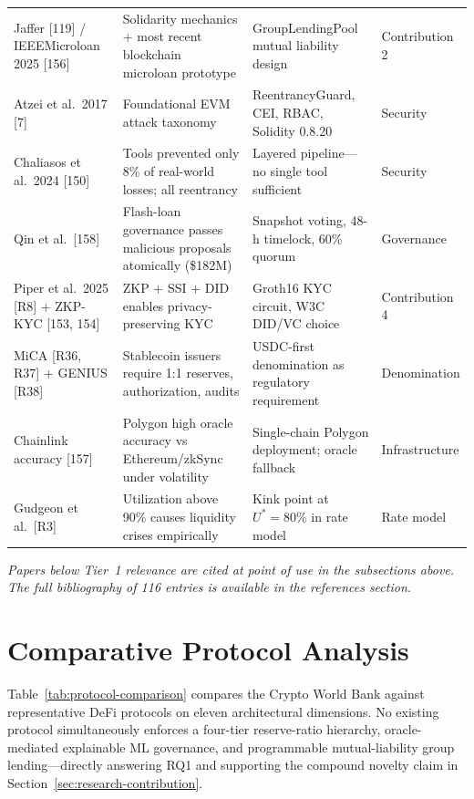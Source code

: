 \documentclass[12pt,a4paper]{report}
\begin{document}
\begin{table}[H]
{\begin{tabular}{@{}>{\raggedright\arraybackslash}p{2.8cm}>{\raggedright\arraybackslash}p{3.6cm}>{\raggedright\arraybackslash}p{3.8cm}>{\raggedright\arraybackslash}p{2.2cm}@{}}
Jaffer [119] / IEEEMicroloan 2025 [156] & Solidarity mechanics + most recent blockchain microloan prototype & GroupLendingPool mutual liability design & Contribution 2 \\
Atzei et al.\ 2017 [7] & Foundational EVM attack taxonomy & ReentrancyGuard, CEI, RBAC, Solidity 0.8.20 & Security \\
\rowcolor{RowShade}
Chaliasos et al.\ 2024 [150] & Tools prevented only 8\% of real-world losses; all reentrancy & Layered pipeline---no single tool sufficient & Security \\
Qin et al.\ [158] & Flash-loan governance passes malicious proposals atomically (\$182M) & Snapshot voting, 48-h timelock, 60\% quorum & Governance \\
\rowcolor{RowShade}
Piper et al.\ 2025 [R8] + ZKP-KYC [153, 154] & ZKP + SSI + DID enables privacy-preserving KYC & Groth16 KYC circuit, W3C DID/VC choice & Contribution 4 \\
MiCA [R36, R37] + GENIUS [R38] & Stablecoin issuers require 1:1 reserves, authorization, audits & USDC-first denomination as regulatory requirement & Denomination \\
\rowcolor{RowShade}
Chainlink accuracy [157] & Polygon high oracle accuracy vs Ethereum/zkSync under volatility & Single-chain Polygon deployment; oracle fallback & Infrastructure \\
Gudgeon et al.\ [R3] & Utilization above 90\% causes liquidity crises empirically & Kink point at $U^{*} = 80\%$ in rate model & Rate model \\
\bottomrule
\end{tabular}%
}
\end{table}

\noindent\textit{Papers below Tier~1 relevance are cited at point of use in the subsections above. The full bibliography of 116 entries is available in the references section.}

\section{Comparative Protocol Analysis}
\label{sec:comparative-protocol}

Table~\ref{tab:protocol-comparison} compares the Crypto World Bank against representative DeFi protocols on eleven architectural dimensions. No existing protocol simultaneously enforces a four-tier reserve-ratio hierarchy, oracle-mediated explainable ML governance, and programmable mutual-liability group lending---directly answering RQ1 and supporting the compound novelty claim in Section~\ref{sec:research-contribution}.
\end{document}
